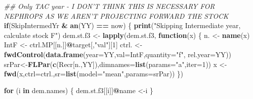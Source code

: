\documentclass[
]{article}
\newenvironment{Shaded}{\begin{snugshade}}{\end{snugshade}}
\newcommand{\CommentTok}[1]{\textcolor[rgb]{0.56,0.35,0.01}{\textit{#1}}}
\newcommand{\ControlFlowTok}[1]{\textcolor[rgb]{0.13,0.29,0.53}{\textbf{#1}}}
\newcommand{\DataTypeTok}[1]{\textcolor[rgb]{0.13,0.29,0.53}{#1}}
\newcommand{\DecValTok}[1]{\textcolor[rgb]{0.00,0.00,0.81}{#1}}
\newcommand{\KeywordTok}[1]{\textcolor[rgb]{0.13,0.29,0.53}{\textbf{#1}}}
\newcommand{\NormalTok}[1]{#1}
\newcommand{\OperatorTok}[1]{\textcolor[rgb]{0.81,0.36,0.00}{\textbf{#1}}}
\newcommand{\StringTok}[1]{\textcolor[rgb]{0.31,0.60,0.02}{#1}}
\begin{document}
\begin{Shaded}
\begin{Highlighting}[]
{{{{{        \CommentTok{## Only TAC year - I DON'T THINK THIS IS NECESSARY FOR NEPHROPS AS WE AREN'T PROJECTING FORWARD THE STOCK}
        \ControlFlowTok{if}\NormalTok{(SkipIntermedYr }\OperatorTok{&}\StringTok{ }\KeywordTok{an}\NormalTok{(YY) }\OperatorTok{==}\StringTok{ }\NormalTok{now) \{}
            \KeywordTok{print}\NormalTok{(}\StringTok{"Skipping Intermediate year, calculate stock F"}\NormalTok{)}
\NormalTok{            dem.st.f3 <-}\StringTok{ }\KeywordTok{lapply}\NormalTok{(dem.st.f3, }\ControlFlowTok{function}\NormalTok{(x) \{  }
\NormalTok{                            n. <-}\StringTok{ }\KeywordTok{name}\NormalTok{(x)}
\NormalTok{                      IntF <-}\StringTok{ }\NormalTok{ctrl.MP[[n.]]}\OperatorTok{@}\NormalTok{target[,}\StringTok{"val"}\NormalTok{][}\DecValTok{1}\NormalTok{]}
\NormalTok{                            ctrl. <-}\StringTok{ }\KeywordTok{fwdControl}\NormalTok{(}\KeywordTok{data.frame}\NormalTok{(}\DataTypeTok{year=}\NormalTok{YY,}\DataTypeTok{val=}\NormalTok{IntF,}\DataTypeTok{quantity=}\StringTok{"f"}\NormalTok{, }\DataTypeTok{rel.year=}\NormalTok{YY))}
\NormalTok{                            srPar<-}\KeywordTok{FLPar}\NormalTok{(}\KeywordTok{c}\NormalTok{(Recr[n.,YY]),}\DataTypeTok{dimnames=}\KeywordTok{list}\NormalTok{(}\DataTypeTok{params=}\StringTok{"a"}\NormalTok{,}\DataTypeTok{iter=}\DecValTok{1}\NormalTok{))}
\NormalTok{                            x <-}\StringTok{ }\KeywordTok{fwd}\NormalTok{(x,}\DataTypeTok{ctrl=}\NormalTok{ctrl.,}\DataTypeTok{sr=}\KeywordTok{list}\NormalTok{(}\DataTypeTok{model=}\StringTok{"mean"}\NormalTok{,}\DataTypeTok{params=}\NormalTok{srPar))}
\NormalTok{                            \})}

            \ControlFlowTok{for}\NormalTok{ (i }\ControlFlowTok{in}\NormalTok{ dem.names) \{}
\NormalTok{                 dem.st.f3[[i]]}\OperatorTok{@}\NormalTok{name <-i}
\NormalTok{                \}}

}}}}}
\end{Highlighting}
\end{Shaded}
\end{document}
